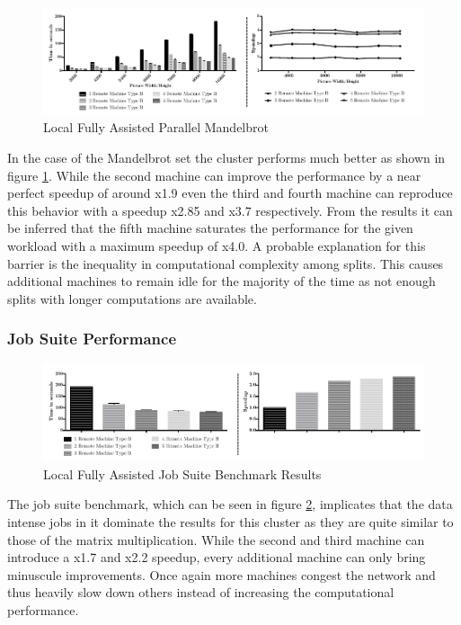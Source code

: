 \begin{figure}[!htb]
	
	\includegraphics[width=1.0\textwidth]{images/local_fully_assisted_mandelbrot.pdf}
	\centering
	\caption{Local Fully Assisted Parallel Mandelbrot}
	\label{img:fully_assisted_parallel_mandelbrot}
\end{figure}

In the case of the Mandelbrot set the cluster performs much better as shown in figure \ref{img:fully_assisted_parallel_mandelbrot}. While the second machine can improve the performance by a near perfect speedup of around x1.9 even the third and fourth machine can reproduce this behavior with a speedup x2.85 and x3.7 respectively. From the results it can be inferred that the fifth machine saturates the performance for the given workload with a maximum speedup of x4.0. A probable explanation for this barrier is the inequality in computational complexity among splits. This causes additional machines to remain idle for the majority of the time as not enough splits with longer computations are available.

\subsubsection*{Job Suite Performance}

\begin{figure}[!htb]
	
	\includegraphics[width=1.0\textwidth]{images/local_fully_assisted_full_benchmark.pdf}
	\centering
	\caption{Local Fully Assisted Job Suite Benchmark Results}
	\label{img:local_fully_assisted_benchmark_results}
\end{figure}

The job suite benchmark, which can be seen in figure \ref{img:local_fully_assisted_benchmark_results}, implicates that the data intense jobs in it dominate the results for this cluster as they are quite similar to those of the matrix multiplication. While the second and third machine can introduce a x1.7 and x2.2 speedup, every additional machine can only bring minuscule improvements. Once again more machines congest the network and thus heavily slow down others instead of increasing the computational performance.

